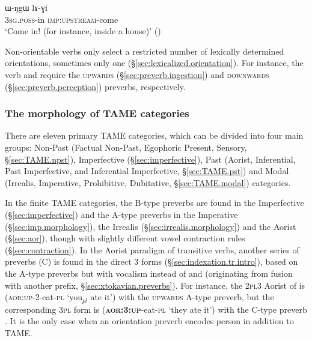  \begin{exe}
\ex \label{ex:WNgW.lAGi}
\gll ɯ-ŋgɯ lɤ-ɣi \\
\textsc{3sg}.\textsc{poss}-in \textsc{imp}:\textsc{upstream}-come \\
\glt `Come in! (for instance, inside a house)' ()
 \end{exe} 
 
 Non-orientable verbs only select a restricted number of lexically determined orientations, sometimes only one (§\ref{sec:lexicalized.orientation}). For instance, the verb  and   require the \textsc{upwards} (§\ref{sec:preverb.ingestion}) and \textsc{downwards} (§\ref{sec:preverb.perception}) preverbs, respectively.

\subsubsection{The morphology of TAME categories}
There are eleven primary TAME categories, which can be divided into four main groups: Non-Past (Factual Non-Past, Egophoric Present, Sensory, §\ref{sec:TAME.npst}), Imperfective (§\ref{sec:imperfective}), Past (Aorist, Inferential, Past Imperfective, and Inferential Imperfective, §\ref{sec:TAME.pst}) and Modal (Irrealis, Imperative, Prohibitive, Dubitative, §\ref{sec:TAME.modal}) categories. 

In the finite TAME categories, the B-type  preverbs are found in the Imperfective (§\ref{sec:imperfective}) and the A-type preverbs in the Imperative (§\ref{sec:imp.morphology}), the Irrealis (§\ref{sec:irrealis.morphology}) and the Aorist (§\ref{sec:aor}), though with slightly different vowel contraction rules (§\ref{sec:contraction}). In the Aorist paradigm of transitive verbs, another series of preverbs (C) is found in the direct 3\flobv{} forms (§\ref{sec:indexation.tr.intro}), based on the A-type preverbs but with  vocalism instead of  and   (originating from fusion with another prefix, §\ref{sec:xtokavian.preverbs}). For instance, the \textsc{2pl}\fl{}3 Aorist of  is  (\textsc{aor}:\textsc{up}-2-eat-\textsc{pl} `you$_{pl}$ ate it') with the \textsc{upwards} A-type  preverb, but the corresponding \textsc{3pl}\flobv{} form is  (\textbf{\textsc{aor}:3\flobv{}:\textsc{up}}-eat-\textsc{pl} `they ate it') with the C-type preverb . It is the only case when an orientation preverb encodes person in addition to TAME.

